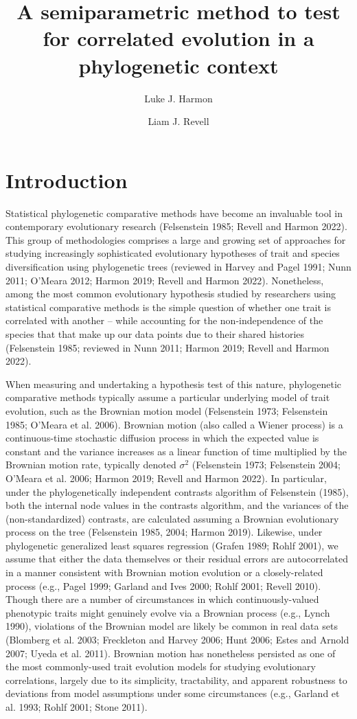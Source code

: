 \documentclass[fleqn,10pt,lineno]{wlpeerj} %
\title{A semiparametric method to test for correlated evolution in a phylogenetic context}
\author[1]{Luke J. Harmon}
\author[2]{Liam J. Revell}
\affil[1]{Department of Biological Sciences, University of Idaho, Moscow, ID, USA}
\affil[2]{Department of Biology, University of Massachusetts Boston, Boston, MA, USA}
\begin{document}
\flushbottom
\maketitle
\thispagestyle{empty}

\section{Introduction}\label{introduction}

Statistical phylogenetic comparative methods have become an invaluable tool in contemporary evolutionary research (Felsenstein 1985; Revell and Harmon 2022). This group of methodologies comprises a large and growing set of approaches for studying increasingly sophisticated evolutionary hypotheses of trait and species diversification using phylogenetic trees (reviewed in Harvey and Pagel 1991; Nunn 2011; O'Meara 2012; Harmon 2019; Revell and Harmon 2022). Nonetheless, among the most common evolutionary hypothesis studied by researchers using statistical comparative methods is the simple question of whether one trait is correlated with another -- while accounting for the non-independence of the species that that make up our data points due to their shared histories (Felsenstein 1985; reviewed in Nunn 2011; Harmon 2019; Revell and Harmon 2022).

When measuring and undertaking a hypothesis test of this nature, phylogenetic comparative methods typically assume a particular underlying model of trait evolution, such as the Brownian motion model (Felsenstein 1973; Felsenstein 1985; O'Meara et al. 2006). Brownian motion (also called a Wiener process) is a continuous-time stochastic diffusion process in which the expected value is constant and the variance increases as a linear function of time multiplied by the Brownian motion rate, typically denoted \(\sigma^2\) (Felsenstein 1973; Felsenstein 2004; O'Meara et al. 2006; Harmon 2019; Revell and Harmon 2022). In particular, under the phylogenetically independent contrasts algorithm of Felsenstein (1985), both the internal node values in the contrasts algorithm, and the variances of the (non-standardized) contrasts, are calculated assuming a Brownian evolutionary process on the tree (Felsenstein 1985, 2004; Harmon 2019). Likewise, under phylogenetic generalized least squares regression (Grafen 1989; Rohlf 2001), we assume that either the data themselves or their residual errors are autocorrelated in a manner consistent with Brownian motion evolution or a closely-related process (e.g., Pagel 1999; Garland and Ives 2000; Rohlf 2001; Revell 2010). Though there are a number of circumstances in which continuously-valued phenotypic traits might genuinely evolve via a Brownian process (e.g., Lynch 1990), violations of the Brownian model are likely be common in real data sets (Blomberg et al. 2003; Freckleton and Harvey 2006; Hunt 2006; Estes and Arnold 2007; Uyeda et al. 2011). Brownian motion has nonetheless persisted as one of the most commonly-used trait evolution models for studying evolutionary correlations, largely due to its simplicity, tractability, and apparent robustness to deviations from model assumptions under some circumstances (e.g., Garland et al. 1993; Rohlf 2001; Stone 2011).
\end{document}
